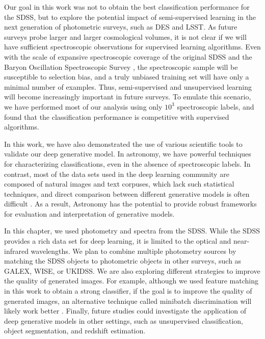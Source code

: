 Our goal in this work was not to obtain the best classification performance for the SDSS,
but to explore the potential impact of semi-supervised learning in the next generation of photometric surveys, such as DES and LSST.
As future surveys probe larger and larger cosmological volumes, it is not clear if we will have sufficient spectroscopic observations
for supervised learning algorithms.
Even with the scale of expansive spectroscopic coverage of the original SDSS and the Baryon Oscillation Spectroscopic Survey
\citep[BOSS;][]{dawson2012baryon}, the spectroscopic sample will be susceptible to selection bias,
and a truly unbiased training set will have only a minimal number of examples.
Thus, semi-supervised and unsupervised learning will become increasingly important in future surveys.
To emulate this scenario, we have performed most of our analysis using only $10^3$ spectroscopic labels, and
found that the classification performance is competitive with supervised algorithms.

In this work, we have also demonstrated the use of various scientific tools to validate our deep generative model.
In astronomy, we have powerful techniques for characterizing classifications, even in the absence of spectroscopic labels.
In contrast, most of the data sets used in the deep learning community are composed of natural images and text corpuses,
which lack such statistical techniques,
and direct comparison between different generative models is often difficult 
\citep{theis2016note}.
As a result, Astronomy has the potential to provide robust frameworks for evaluation and interpretation of generative models.

In this chapter, we used photometry and spectra from the SDSS.
While the SDSS provides a rich data set for deep learning,
it is limited to the optical and near-infrared wavelengths.
We plan to combine multiple photometry sources by matching the SDSS objects to
photometric objects in other surveys, such as GALEX, WISE, or UKIDSS.
We are also exploring different strategies to improve the quality of generated images.
For example, although we used feature matching in this work to obtain a strong classifier,
if the goal is to improve the quality of generated images, an alternative technique
called minibatch discrimination will likely work better \citep{salimans2016improved,dai2017good}.
Finally, future studies could investigate the application of deep generative models in other settings,
such as unsupervised classification, object segmentation, and redshift estimation.

